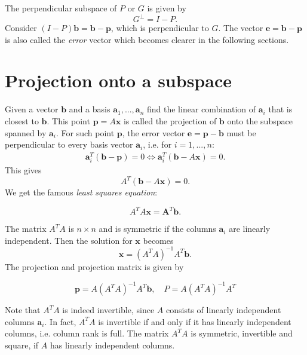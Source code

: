 \documentclass[a4paper, 11pt]{article}
\theoremstyle{plain}
\theoremstyle{definition}
\begin{document}
The perpendicular subspace of $P$ or $G$ is given by
\[
	G^{\perp} = I - P.
\] 
Consider $(I-P)\mathbf b = \mathbf b - \mathbf p$, which is perpendicular to $G$. The vector $\mathbf e = \mathbf b - \mathbf p$ is also called the \emph{error} vector which becomes clearer in the following sections.


\section{Projection onto a subspace}
Given a vector $\mathbf b$ and a basis $\mathbf a_1,...,\mathbf a_n$ find the linear combination of $\mathbf a_i$ that is closest to $\mathbf b$. This point $\mathbf p = A \mathbf x$ is called the projection of $\mathbf b$ onto the subspace spanned by $\mathbf a_i$. For such point $\mathbf p$, the error vector $\mathbf e = \mathbf p - \mathbf b$ must be perpendicular to every basis vector $\mathbf a_i$, i.e. for $i = 1,...,n$:
\begin{gather*}
	\mathbf a_i^T (\mathbf b - \mathbf p) = 0 \iff \mathbf a_i^T (\mathbf b - A\mathbf x) = 0.
\end{gather*}
This gives
\[
	A^T(\mathbf b - A \mathbf x) = 0.
\]
We get the famous \emph{least squares equation}:
\begin{framed}
\[
	 A^TA\mathbf x = \mathbf A^T \mathbf b.
\]
\end{framed}
The matrix $A^TA$ is $n \times n$ and is symmetric if the columns $\mathbf a_i$ are linearly independent. Then the solution for $\mathbf x$ becomes
\[
	\mathbf x = (A^TA)^{-1}A^T\mathbf b.
\]
The projection and projection matrix is given by
\begin{framed}
\[
	\mathbf p = A(A^TA)^{-1}A^T\mathbf b, \quad P = A(A^TA)^{-1}A^T
\]
\end{framed}
Note that $A^TA$ is indeed invertible, since $A$ consists of linearly independent columns $\mathbf a_i$. In fact, $A^TA$ is invertible if and only if it has linearly independent columns, i.e. column rank is full. The matrix $A^TA$ is symmetric, invertible and square, if $A$ has linearly independent columns.
\end{document}
